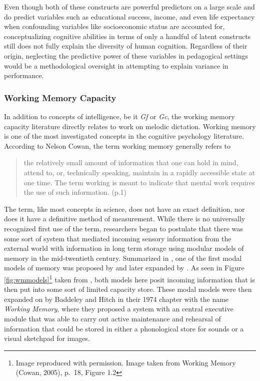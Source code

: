 \documentclass[12pt,]{book}
\let\rmarkdownfootnote\footnote%
\def\footnote{\protect\rmarkdownfootnote}
\begin{document}
Even though both of these constructs are powerful predictors on a large scale and do predict variables such as educational success, income, and even life expectancy \citep{ritchieIntelligenceAllThat2015} when confounding variables like socioeconomic status are accounted for, conceptualizing cognitive abilities in terms of only a handful of latent constructs still does not fully explain the diversity of human cognition.
Regardless of their origin, neglecting the predictive power of these variables in pedagogical settings would be a methodological oversight in attempting to explain variance in performance.

\hypertarget{working-memory-capacity}{%
\subsubsection{Working Memory Capacity}\label{working-memory-capacity}}

In addition to concepts of intelligence, be it \emph{Gf} or \emph{Gc}, the working memory capacity literature directly relates to work on melodic dictation.
Working memory is one of the most investigated concepts in the cognitive psychology literature.
According to Nelson Cowan, the term working memory generally refers to

\begin{quote}
the relatively small amount of information that one can hold in mind, attend to, or, technically speaking, maintain in a rapidly accessible state at one time. The term working is meant to indicate that mental work requires the use of such information. (p.1) \citep{cowanWorkingMemoryCapacity2005}
\end{quote}

The term, like most concepts in science, does not have an exact definition, nor does it have a definitive method of measurement.
While there is no universally recognized first use of the term, researchers began to postulate that there was some sort of system that mediated incoming sensory information from the external world with information in long term storage using modular models of memory in the mid-twentieth century.
Summarized in \citet{cowanWorkingMemoryCapacity2005}, one of the first modal models of memory was proposed by \citet{broadbentPerceptionCommunication1958} and later expanded by \citet{atkinsonHumanMemoryProposed1968}.
As seen in Figure \ref{fig:wmmodels}\footnote{Image reproduced with permission. Image taken from Working Memory (Cowan, 2005), p.~18, Figure 1.2} taken from \citet{cowanWorkingMemoryCapacity2005}, both models here posit incoming information that is then put into some sort of limited capacity store.
These modal models were then expanded on by Baddeley and Hitch \citep{baddeleyWorkingMemory1974} in their 1974 chapter with the name \emph{Working Memory}, where they proposed a system with an central executive module that was able to carry out active maintenance and rehearsal of information that could be stored in either a phonological store for sounds or a visual sketchpad for images.
\end{document}

